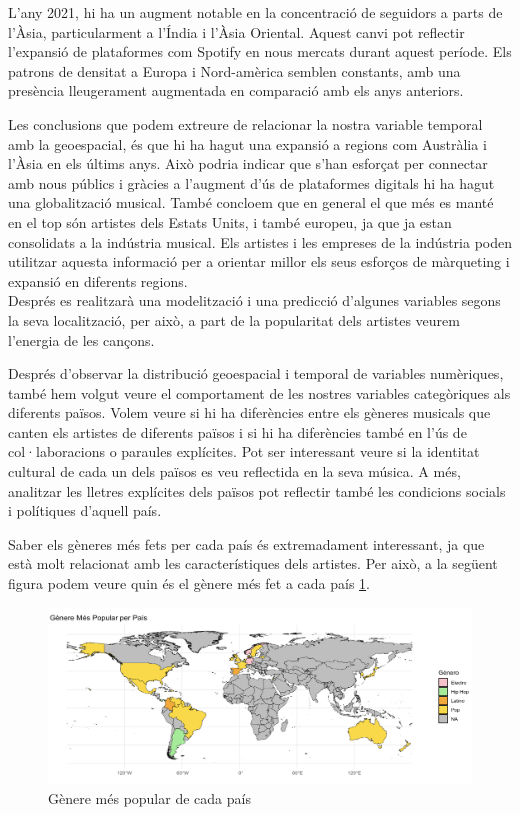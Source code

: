 L'any 2021, hi ha un augment notable en la concentració de seguidors a parts de l'Àsia, particularment a l'Índia i l'Àsia Oriental. Aquest canvi pot reflectir l'expansió de plataformes com Spotify en nous mercats durant aquest període. Els patrons de densitat a Europa i Nord-amèrica semblen constants, amb una presència lleugerament augmentada en comparació amb els anys anteriors.

Les conclusions que podem extreure de relacionar la nostra variable temporal amb la geoespacial, és que hi ha hagut una expansió a regions com Austràlia i l'Àsia en els últims anys. Això podria indicar que s'han esforçat per connectar amb nous públics i gràcies a l'augment d'ús de plataformes digitals hi ha hagut una globalització musical. També concloem que en general el que més es manté en el top són artistes dels Estats Units, i també europeu, ja que ja estan consolidats a la indústria musical. Els artistes i les empreses de la indústria poden utilitzar aquesta informació per a orientar millor els seus esforços de màrqueting i expansió en diferents regions.\\

Després es realitzarà una modelització i una predicció d'algunes variables segons la seva localització, per això, a part de la popularitat dels artistes veurem l'energia de les cançons.

Després d'observar la distribució geoespacial i temporal de variables numèriques, també hem volgut veure el comportament de les nostres variables categòriques als diferents països. Volem veure si hi ha diferències entre els gèneres musicals que canten els artistes de diferents països i si hi ha diferències també en l'ús de col·laboracions o paraules explícites. Pot ser interessant veure si la identitat cultural de cada un dels països es veu reflectida en la seva música. A més, analitzar les lletres explícites dels països pot reflectir també les condicions socials i polítiques d'aquell país.

Saber els gèneres més fets per cada país és extremadament interessant, ja que està molt relacionat amb les característiques dels artistes. Per això, a la següent figura podem veure quin és el gènere més fet a cada país \ref{fig:geo_genres_country}.
\begin{figure}[H]
    \centering
    \includegraphics[width=0.8\linewidth]{Images/7_Geospatial/1_descriptive/genere_mes_popular_per_pais.png}
    \caption{Gènere més popular de cada país}
    \label{fig:geo_genres_country}
\end{figure}

